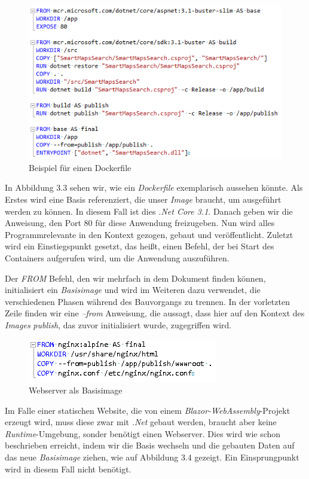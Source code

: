 \documentclass[12pt,a4paper]{scrartcl}
\begin{document}
\begin{figure}[h!]
	\centering
	\includegraphics[scale=1]{DockerfileWhite.png}
	\caption[Beispiel für einen Dockerfile]{Beispiel für einen Dockerfile}
\end{figure}

In Abbildung 3.3 sehen wir, wie ein \emph{Dockerfile} exemplarisch aussehen könnte. Als Erstes wird eine Basis referenziert, die unser \emph{Image} braucht, um ausgeführt werden zu können. In diesem Fall ist dies \emph{.Net Core 3.1}. Danach geben wir die Anweisung, den Port 80 für diese Anwendung freizugeben. Nun wird alles Programmrelevante in den Kontext gezogen, gebaut und veröffentlicht. Zuletzt wird ein Einstiegspunkt gesetzt, das heißt, einen Befehl, der bei Start des Containers aufgerufen wird, um die Anwendung auszuführen. 

Der \emph{FROM} Befehl, den wir mehrfach in dem Dokument finden können, initialisiert ein \emph{Basisimage} und wird im Weiteren dazu verwendet, die verschiedenen Phasen während des Bauvorgangs zu trennen. In der vorletzten Zeile finden wir eine \emph{--from} Anweisung, die aussagt, dass hier auf den Kontext des \emph{Images} \emph{publish}, das zuvor initialisiert wurde, zugegriffen wird.

\begin{figure}[h!]
	\centering
	\includegraphics[scale=1]{DockerfileBlazor.png}
	\caption[Webserver als Basisimage]{Webserver als Basisimage}
\end{figure}

Im Falle einer statischen Website, die von einem \emph{Blazor-WebAssembly}-Projekt erzeugt wird, muss diese zwar mit \emph{.Net} gebaut werden, braucht aber keine \emph{Runtime}-Umgebung, sonder benötigt einen Webserver.
Dies wird wie schon beschrieben erreicht, indem wir die Basis wechseln und die gebauten Daten auf das neue \emph{Basisimage} ziehen, wie auf Abbildung 3.4 gezeigt. Ein Einsprungpunkt wird in diesem Fall nicht benötigt.
\end{document}
